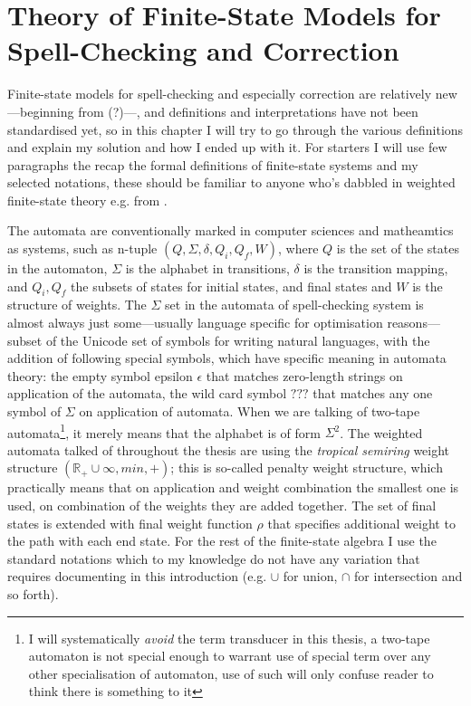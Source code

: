 \documentclass[officiallayout,draft]{unihelcompling}
\begin{document}
\section{Theory of Finite-State Models for Spell-Checking and Correction}

Finite-state models for spell-checking and especially correction are relatively
new---beginning from \cite{oflazer1996errortolerant}(?)---, and definitions and
interpretations have not been standardised yet, so in this chapter I will try
to go through the various definitions and explain my solution and how I ended
up with it. For starters I will use few paragraphs the recap the formal
definitions of finite-state systems and my selected notations, these should be
familiar to anyone who's dabbled in weighted finite-state theory e.g. from
\cite{aho2007compilers,mohri1997finitestate}.

The automata are conventionally marked in computer sciences and matheamtics as
systems, such as n-tuple $(Q, \Sigma, \delta, Q_i, Q_f, W)$, where $Q$ is the
set of the states in the automaton, $\Sigma$ is the alphabet in transitions,
$\delta$ is the transition mapping, and $Q_i, Q_f$ the subsets of states for
initial states, and final states and $W$ is the structure of weights. The
$\Sigma$ set in the automata of spell-checking system is almost always just
some---usually language specific for optimisation reasons---subset of the
Unicode set of symbols for writing natural languages, with the addition of
following special symbols, which have specific meaning in automata theory: the
empty symbol epsilon $\epsilon$ that matches zero-length strings on application
of the automata, the wild card symbol $???$ that matches any one symbol of $\Sigma$ on application of automata.  When
we are talking of two-tape automata\footnote{I will systematically \emph{avoid}
    the term transducer in this thesis, a two-tape automaton is not special
enough to warrant use of special term over any other specialisation of
automaton, use of such will only confuse reader to think there is something to
it}, it merely means that the alphabet is of form $\Sigma^2$. The weighted
automata talked of throughout the thesis are using the \emph{tropical semiring}
weight structure $(\mathbb{R}_+ \cup \infty, min, +)$; this is so-called
penalty weight structure, which practically means that on application and
weight combination the smallest one is used, on combination of the weights they
are added together. The set of final states is extended with final weight
function $\rho$ that specifies additional weight to the path with each end 
state. For the rest of the finite-state algebra I use the standard notations
which to my knowledge do not have any variation that requires documenting in
this introduction (e.g. $\cup$ for union, $\cap$ for intersection and so forth).
\end{document}

